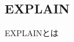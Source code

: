 \documentclass[../../../main]{subfiles}
\begin{document}
    \subsection{EXPLAIN}\label{subsec:phraseology-explain}

    EXPLAINとは
\end{document}
